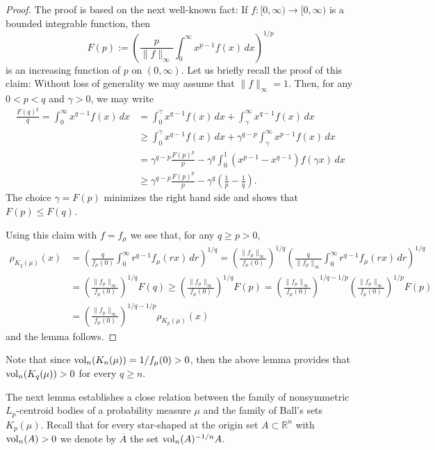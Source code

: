 \documentclass[11pt,leqno]{article}
\theoremstyle{definition}
\theoremstyle{remark}
\numberwithin{equation}{section}
\newcommand{\vol}{{\rm vol}}
\newcommand{\ls}{\leqslant}
\newcommand{\gr}{\geqslant}
\newcommand{\1}{\textbf{1}}
\begin{document}
\begin{proof}The proof is based on the next well-known fact:
If $f:[0,\infty) \to [0,\infty)$ is a bounded integrable function, then
\begin{equation*} F(p):= \left( \frac{p}{\|f\|_\infty} \int_0^\infty x^{p-1}f(x) \, dx\right)^{1/p}
\end{equation*} is an increasing function of $p$ on $(0,\infty)$.
Let us briefly recall the proof of this claim: Without loss of generality we may assume
that $\|f\|_\infty=1$. Then, for any $0<p<q$ and $\gamma>0$, we may write
\begin{align*} \frac{F(q)^q}{q}=\int_0^\infty x^{q-1}f(x)\,
dx&=\int_0^{\gamma}x^{q-1}f(x)\, dx +\int_{\gamma}^\infty x^{q-1}f(x)\, dx\\
\nonumber &\gr  \int_0^{\gamma}x^{q-1}f(x)\, dx+\gamma^{q-p}\int_{\gamma}^\infty
x^{p-1}f(x)\,
dx\\
\nonumber &= \gamma^{q-p}\frac{F(p)^p}{p}-\gamma^q\int_0^1(x^{p-1}-x^{q-1})f(\gamma x)\, dx\\
\nonumber &\gr
\gamma^{q-p}\frac{F(p)^p}{p}-\gamma^q\left(\frac{1}{p}-\frac{1}{q}\right).
\end{align*}The choice $\gamma=F(p)$ minimizes the right hand side and shows that
$F(p)\ls F(q)$.

Using this claim with $f=f_{\mu}$ we see that, for any $q\gr p>0$,
\begin{align*}\rho_{K_q(\mu)}(x) &=\left (\frac{q}{f_{\mu}(0)}
\int_0^{\infty} r^{q-1}f_{\mu}(rx)\, dr \right)^{1/q}
=\left (\frac{\| f_{\mu}\|_{\infty }}{f_{\mu}(0)}\right )^{1/q}\left
(\frac{q}{\| f_{\mu}\|_{\infty }} \int_0^{\infty} r^{q-1}f_{\mu}(rx)\, dr
\right)^{1/q}\\
&=\left (\frac{\| f_{\mu}\|_{\infty }}{f_{\mu}(0)}\right )^{1/q}F(q)
\gr \left (\frac{\| f_{\mu}\|_{\infty }}{f_{\mu}(0)}\right )^{1/q}F(p)
=\left (\frac{\| f_{\mu}\|_{\infty }}{f_{\mu}(0)}\right
)^{1/q-1/p}\left (\frac{\| f_{\mu}\|_{\infty }}{f_{\mu}(0)}\right )^{1/p}F(p)\\
&=\left (\frac{\| f_{\mu}\|_{\infty }}{f_{\mu}(0)}\right
)^{1/q-1/p}\rho_{K_p(\mu)}(x)
\end{align*}
and the lemma follows. \end{proof}

Note that since $\vol_n(K_n(\mu))=1/f_{\mu}(0)>0$, then the above lemma provides that $\vol_n(K_q(\mu))>0$ for every $q \gr n$.

The next lemma establishes a close relation between the family of nonsymmetric $L_p$-centroid
bodies of a probability measure $\mu $ and the family of Ball's sets $K_p(\mu )$. Recall
that for every star-shaped at the origin set $A\subset {\mathbb R}^n$ with $\vol_n(A)>0$ we
denote by $\overline{A}$ the set $\vol_n(A)^{-1/n}A$.
\end{document}
